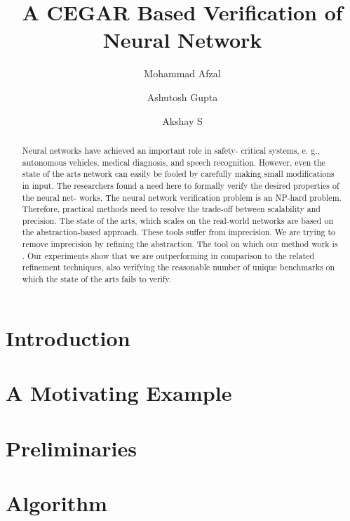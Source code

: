 \documentclass[10pt]{llncs}
\title{A CEGAR Based Verification of Neural Network}
\author{Mohammad Afzal\inst{1,2}\and Ashutosh Gupta\inst{1}\and Akshay S\inst{1}}
\institute{Indian Institute of Technology, Bombay, India\and TCS Research, Pune, India}
\begin{document}
\maketitle

\begin{abstract}
       Neural networks have achieved an important role in safety-
       critical systems, e. g., autonomous vehicles, medical diagnosis, and speech
       recognition. However, even the state of the arts network can easily be
       fooled by carefully making small modifications in input. The researchers
       found a need here to formally verify the desired properties of the neural net-
       works. The neural network verification problem is an NP-hard problem.
       Therefore, practical methods need to resolve the trade-off between scalability and precision. The state of the arts, which scales on the real-world
       networks are based on the abstraction-based approach. These tools suffer
       from imprecision. We are trying to remove imprecision by refining the
       abstraction. The tool on which our method work is \deeppoly{}. Our experiments show that we are outperforming in comparison to the related
       refinement techniques, also verifying the reasonable number of unique
       benchmarks on which the state of the arts fails to verify. 
\end{abstract}

\section{Introduction}
\label{sec:intro}
%


\section{A Motivating Example}
\label{sec:motivation}


\section{Preliminaries}
\label{sec:model}




\section{Algorithm}
\label{sec:algo}

\end{document}
